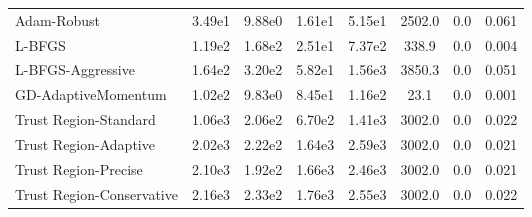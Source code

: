 \documentclass{article}
\begin{document}
\begin{table}[htbp]
{\begin{tabular}{p{2.5cm}*{7}{c}}
Adam-Robust & 3.49e1 & 9.88e0 & 1.61e1 & 5.15e1 & 2502.0 & 0.0 & 0.061 \\
L-BFGS & 1.19e2 & 1.68e2 & 2.51e1 & 7.37e2 & 338.9 & 0.0 & 0.004 \\
L-BFGS-Aggressive & 1.64e2 & 3.20e2 & 5.82e1 & 1.56e3 & 3850.3 & 0.0 & 0.051 \\
GD-AdaptiveMomentum & 1.02e2 & 9.83e0 & 8.45e1 & 1.16e2 & 23.1 & 0.0 & 0.001 \\
Trust Region-Standard & 1.06e3 & 2.06e2 & 6.70e2 & 1.41e3 & 3002.0 & 0.0 & 0.022 \\
Trust Region-Adaptive & 2.02e3 & 2.22e2 & 1.64e3 & 2.59e3 & 3002.0 & 0.0 & 0.021 \\
Trust Region-Precise & 2.10e3 & 1.92e2 & 1.66e3 & 2.46e3 & 3002.0 & 0.0 & 0.021 \\
Trust Region-Conservative & 2.16e3 & 2.33e2 & 1.76e3 & 2.55e3 & 3002.0 & 0.0 & 0.022 \\
\bottomrule
\end{tabular}
}
\end{table}
\end{document}
